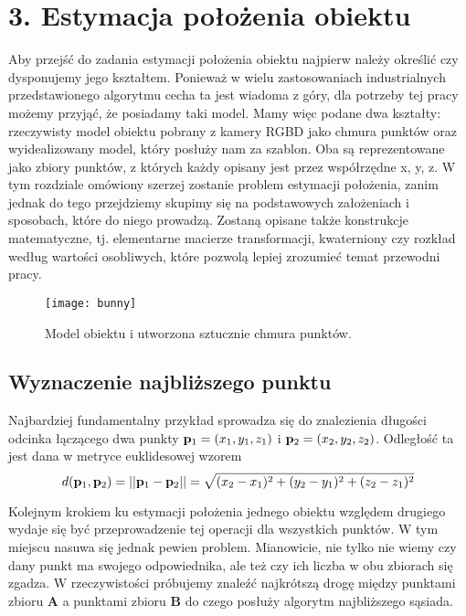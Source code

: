\documentclass{article}
\begin{document}
\newpage
\section*{\LARGE{3. Estymacja położenia obiektu}} 

Aby przejść do zadania estymacji położenia obiektu najpierw należy określić czy dysponujemy jego kształtem. Ponieważ w wielu zastosowaniach industrialnych przedstawionego algorytmu cecha ta jest wiadoma z góry, dla potrzeby tej pracy możemy przyjąć, że posiadamy taki model. Mamy więc podane dwa kształty: rzeczywisty model obiektu pobrany z kamery RGBD jako chmura punktów oraz wyidealizowany model, który posłuży nam za szablon. Oba są reprezentowane jako zbiory punktów, z których każdy opisany jest przez współrzędne x, y, z. W tym rozdziale omówiony szerzej zostanie problem estymacji położenia, zanim jednak do tego przejdziemy skupimy się na podstawowych założeniach i sposobach, które do niego prowadzą. Zostaną opisane także konstrukcje matematyczne, tj. elementarne macierze transformacji, kwaterniony czy rozkład według wartości osobliwych, które pozwolą lepiej zrozumieć temat przewodni pracy.

\begin{figure}[h]
\centering
\texttt{[image: bunny]}
\caption{Model obiektu i utworzona sztucznie chmura punktów.}
\end{figure}

\subsection*{\LARGE{Wyznaczenie najbliższego punktu}} 

Najbardziej fundamentalny przykład sprowadza się do znalezienia długości odcinka łączącego dwa punkty $\vb{p}_{1} = (x_{1}, y_{1}, z_{1})$ i $\vb{p}_{2} = (x_{2}, y_{2}, z_{2})$. Odległość ta jest dana w metryce euklidesowej wzorem
\[d(\vb{p}_{1}, \vb{p}_{2}) = ||\vb{p}_{1} - \vb{p}_{2}|| = \sqrt{(x_{2}-x_{1})^2+(y_{2}-y_{1})^2+(z_{2}-z_{1})^2}\]

Kolejnym krokiem ku estymacji położenia jednego obiektu względem drugiego wydaje się być przeprowadzenie tej operacji dla wszystkich punktów. W tym miejscu nasuwa się jednak pewien problem. Mianowicie, nie tylko nie wiemy czy dany punkt ma swojego odpowiednika, ale też czy ich liczba w obu zbiorach się zgadza. W rzeczywistości próbujemy znaleźć najkrótszą drogę między punktami zbioru $\mathbf{A}$ a punktami zbioru $\mathbf{B}$ do czego posłuży algorytm najbliższego sąsiada.
\end{document}
